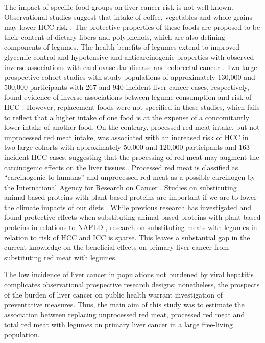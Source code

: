 \documentclass[nutrients,article,submit,moreauthors,pdftex]{Definitions/mdpi}
\begin{document}
The impact of specific food groups on liver cancer risk is not well
known. Observational studies suggest that intake of coffee, vegetables
and whole grains may lower HCC risk \citep{zhang2013, yang2014, Liu2021, Bhurwal2020}. The protective properties of these foods are proposed to
be their content of dietary fibers and polyphenols, which are also
defining components of legumes. The health benefits of legumes extend to
improved glycemic control and hypotensive and anticarcinogenic
properties with observed inverse associations with cardiovascular
disease and colorectal cancer \citep{viguiliouk2019, jin2022}. Two large
prospective cohort studies with study populations of approximately
130,000 and 500,000 participants with 267 and 940 incident liver cancer
cases, respectively, found evidence of inverse associations between
legume consumption and risk of HCC \citep{zhang2013, Liu2021}. However,
replacement foods were not specified in these studies, which fails to
reflect that a higher intake of one food is at the expense of a
concomitantly lower intake of another food. On the contrary, processed
red meat intake, but not unprocessed red meat intake, was associated
with an increased risk of HCC in two large cohorts with approximately
50,000 and 120,000 participants and 163 incident HCC cases, suggesting
that the processing of red meat may augment the carcinogenic effects on
the liver tissues \citep{Ma2019}. Processed red meat is classified as
``carcinogenic to humans'' and unprocessed red meat as a possible
carcinogen by the International Agency for Research on Cancer
\citep{Bouvard2015}. Studies on substituting animal-based proteins with
plant-based proteins are important if we are to lower the climate
impacts of our diets \citep{RN71}. While previous research has investigated
and found protective effects when substituting animal-based proteins
with plant-based proteins in relations to NAFLD \citep{Zhang2023}, research
on substituting meats with legumes in relation to risk of HCC and ICC is
sparse. This leaves a substantial gap in the current knowledge on the
beneficial effects on primary liver cancer from substituting red meat
with legumes.

The low incidence of liver cancer in populations not burdened by viral
hepatitis complicates observational prospective research designs;
nonetheless, the prospects of the burden of liver cancer on public
health warrant investigation of preventative measures. Thus, the main
aim of this study was to estimate the association between replacing
unprocessed red meat, processed red meat and total red meat with legumes
on primary liver cancer in a large free-living population.
\end{document}
